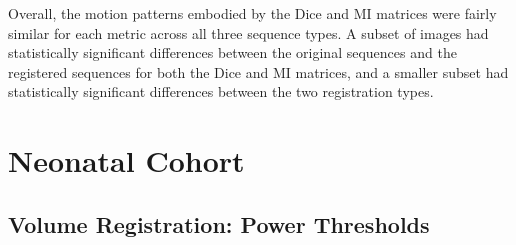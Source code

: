 
Overall, the motion patterns embodied by the Dice and MI matrices were fairly similar for each metric across all three sequence types. A subset of images had statistically significant differences between the original sequences and the registered sequences for both the Dice and MI matrices, and a smaller subset had statistically significant differences between the two registration types. 

\section{Neonatal Cohort}

\subsection{Volume Registration: Power Thresholds}

